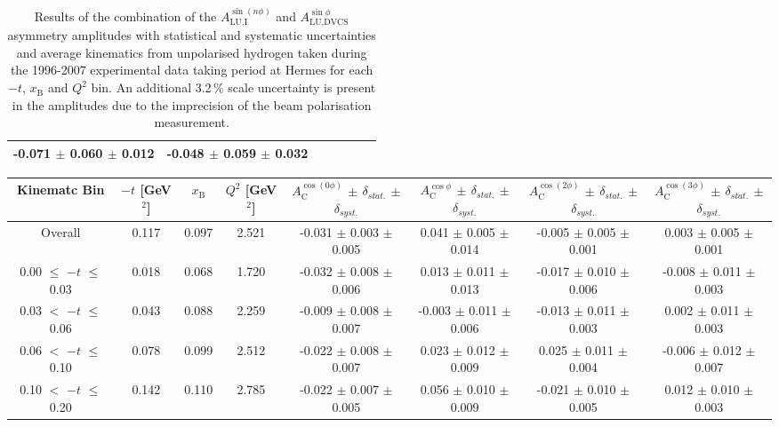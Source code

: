 \begin{table}[width=15cm]
\begin{center}
{\begin{tabular}{|c|c|c|c|c|c|c|}
-0.071  $\pm$  0.060 $\pm$ 0.012 & -0.048  $\pm$  0.059  $\pm$  0.032\\
\hline
  \end{tabular}
}
 \end{center}
\caption{Results of the combination of the $A_{\textrm{LU,I}}^{\sin(n\phi)}$ and $A_{\textrm{LU,DVCS}}^{\sin \phi}$ asymmetry amplitudes with statistical and systematic uncertainties and average kinematics from unpolarised hydrogen taken during
the 1996-2007 experimental data taking period at H{\sc ermes} for each $-t$, $x_{\textrm{B}}$ and $Q^{2}$ bin.
An additional 3.2\,\% scale uncertainty is present in the amplitudes due to the imprecision of
the beam polarisation measurement.
}
\end{table}


\begin{table}[width=15cm]
 \begin{center}
\resizebox{16cm}{!} {
  \begin{tabular}{|c|c|c|c|c|c|c|c|}
\hline
Kinematc Bin &  $-t$ [GeV$^{2}$] & $x_{\textrm{B}}$ & $Q^{2}$ [GeV$^{2}$] & 
$A_{\textrm{C}}^{\cos(0\phi)}$ $\pm$ $\delta_{stat.}$ $\pm$ $\delta_{syst.}$ & $A_{\textrm{C}}^{\cos\phi}$ $\pm$ $\delta_{stat.}$ $\pm$ $\delta_{syst.}$
& $A_{\textrm{C}}^{\cos(2\phi)}$ $\pm$ $\delta_{stat.}$ $\pm$ $\delta_{syst.}$ & $A_{\textrm{C}}^{\cos(3\phi)}$ $\pm$ $\delta_{stat.}$ $\pm$ $\delta_{syst.}$ \\
\hline
\hline
Overall &  0.117 & 0.097 &  2.521 &  -0.031 $\pm$  0.003 $\pm$  0.005 & 
0.041  $\pm$  0.005 $\pm$   0.014 &  -0.005  $\pm$  0.005  $\pm$   0.001 &  0.003  $\pm$   0.005   $\pm$   0.001 \\
\hline
0.00 $\leqslant$ $-t$ $\leqslant$ 0.03 &  0.018 & 0.068 &  1.720 &  -0.032  $\pm$  0.008 $\pm$ 0.006 & 
0.013  $\pm$  0.011  $\pm$   0.013 &  -0.017  $\pm$  0.010 $\pm$  0.006 &  -0.008   $\pm$  0.011   $\pm$   0.003\\
0.03 $<$ $-t$ $\leqslant$ 0.06 &  0.043 & 0.088 &  2.259& -0.009  $\pm$  0.008  $\pm$   0.007 &
 -0.003 $\pm$  0.011  $\pm$   0.006 &  -0.013  $\pm$  0.011  $\pm$  0.003 &  0.002   $\pm$  0.011   $\pm$   0.003\\
0.06 $<$ $-t$ $\leqslant$ 0.10 &  0.078 & 0.099 &  2.512 & -0.022  $\pm$  0.008  $\pm$  0.007 & 
0.023 $\pm$  0.012  $\pm$   0.009 & 0.025  $\pm$  0.011 $\pm$   0.004 &  -0.006   $\pm$  0.012  $\pm$    0.007\\
0.10 $<$ $-t$ $\leqslant$ 0.20 &  0.142 & 0.110 &  2.785 &  -0.022  $\pm$  0.007   $\pm$  0.005 & 
0.056 $\pm$  0.010  $\pm$   0.009 &  -0.021  $\pm$  0.010  $\pm$  0.005 & 0.012   $\pm$  0.010    $\pm$  0.003\\

\end{tabular}}
\end{center}
\end{table}
